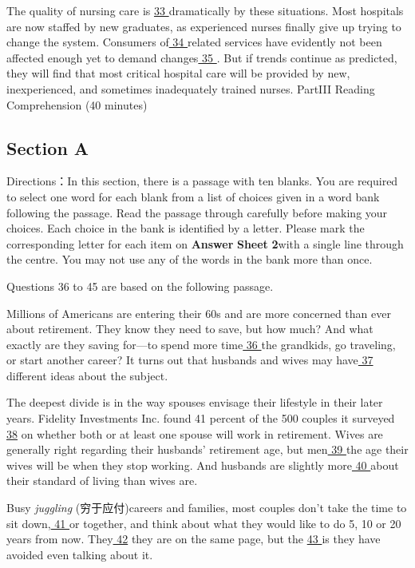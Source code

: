 \documentclass[UTF8,11pt]{ctexart}
\begin{document}
The quality of nursing care is \uline{33 }dramatically by these situations. Most hospitals are now staffed by new graduates, as experienced nurses finally give up trying to change the system. Consumers of\uline{ 34 }related services have evidently not been affected enough yet to demand changes\uline{ 35 }. But if trends continue as predicted, they will find that most critical hospital care will be provided by new, inexperienced, and sometimes inadequately trained nurses. PartIII Reading Comprehension (40 minutes)


\subsection*{Section A}


Directions：In this section, there is a passage with ten blanks. You are required to select one word for each blank from a list of choices given in a word bank following the passage. Read the passage through carefully before making your choices. Each choice in the bank is identified by a letter. Please mark the corresponding letter for each item on\textbf{ Answer} \textbf{Sheet} \textbf{2}with a single line through the centre. You may not use any of the words in the bank more than once.


Questions 36 to 45 are based on the following passage.


Millions of Americans are entering their 60s and are more concerned than ever about retirement. They know they need to save, but how much? And what exactly are they saving for—to spend more time\uline{ 36 }the grandkids, go traveling, or start another career? It turns out that husbands and wives may have\uline{ 37 }different ideas about the subject.


The deepest divide is in the way spouses envisage their lifestyle in their later years. Fidelity Investments Inc. found 41 percent of the 500 couples it surveyed \uline{38} on whether both or at least one spouse will work in retirement. Wives are generally right regarding their husbands’ retirement age, but men\uline{ 39 }the age their wives will be when they stop working. And husbands are slightly more\uline{ 40 }about their standard of living than wives are.


Busy\textit{ juggling} (穷于应付)careers and families, most couples don’t take the time to sit down,\uline{ 41 }or together, and think about what they would like to do 5, 10 or 20 years from now. They\uline{ 42} they are on the same page, but the \uline{43 }is they have avoided even talking about it.
\end{document}
